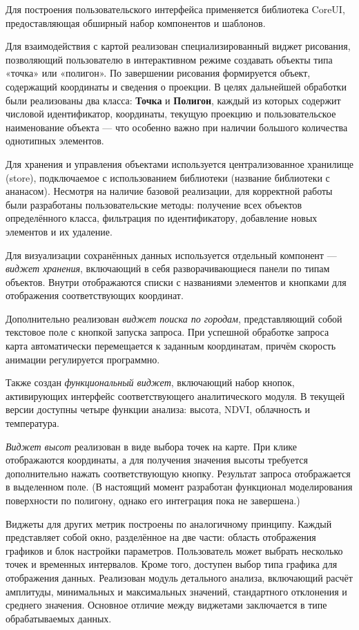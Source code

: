 Для построения пользовательского интерфейса применяется библиотека CoreUI, предоставляющая обширный набор компонентов и шаблонов.

Для взаимодействия с картой реализован специализированный виджет рисования, позволяющий пользователю в интерактивном режиме создавать объекты типа «точка» или «полигон». По завершении рисования формируется объект, содержащий координаты и сведения о проекции. В целях дальнейшей обработки были реализованы два класса: \textbf{Точка} и \textbf{Полигон}, каждый из которых содержит числовой идентификатор, координаты, текущую проекцию и пользовательское наименование объекта — что особенно важно при наличии большого количества однотипных элементов.

Для хранения и управления объектами используется централизованное хранилище (store), подключаемое с использованием библиотеки (название библиотеки с ананасом). Несмотря на наличие базовой реализации, для корректной работы были разработаны пользовательские методы: получение всех объектов определённого класса, фильтрация по идентификатору, добавление новых элементов и их удаление.

Для визуализации сохранённых данных используется отдельный компонент — \textit{виджет хранения}, включающий в себя разворачивающиеся панели по типам объектов. Внутри отображаются списки с названиями элементов и кнопками для отображения соответствующих координат.

Дополнительно реализован \textit{виджет поиска по городам}, представляющий собой текстовое поле с кнопкой запуска запроса. При успешной обработке запроса карта автоматически перемещается к заданным координатам, причём скорость анимации регулируется программно.

Также создан \textit{функциональный виджет}, включающий набор кнопок, активирующих интерфейс соответствующего аналитического модуля. В текущей версии доступны четыре функции анализа: высота, NDVI, облачность и температура.


\textit{Виджет высот} реализован в виде выбора точек на карте. При клике отображаются координаты, а для получения значения высоты требуется дополнительно нажать соответствующую кнопку. Результат запроса отображается в выделенном поле. (В настоящий момент разработан функционал моделирования поверхности по полигону, однако его интеграция пока не завершена.)

Виджеты для других метрик построены по аналогичному принципу. Каждый представляет собой окно, разделённое на две части: область отображения графиков и блок настройки параметров. Пользователь может выбрать несколько точек и временных интервалов. Кроме того, доступен выбор типа графика для отображения данных. Реализован модуль детального анализа, включающий расчёт амплитуды, минимальных и максимальных значений, стандартного отклонения и среднего значения. Основное отличие между виджетами заключается в типе обрабатываемых данных.

